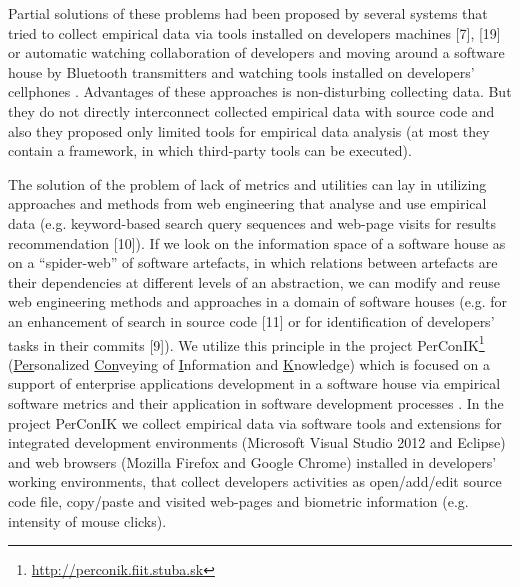 \documentclass[18px,a4, conference]{IEEEtran}
\begin{document}
 Partial solutions of these problems had been proposed by several systems that tried to collect empirical data via tools installed on developers machines [7], [19] or automatic watching collaboration of developers and moving around a software house by Bluetooth transmitters and watching tools installed on developers’ cellphones \cite{Corral2012}. Advantages of these approaches is non-disturbing collecting data. But they do not directly interconnect collected empirical data with source code and also they proposed only limited tools for empirical data analysis (at most they contain a framework, in which third-party tools can be executed).

 The solution of the problem of lack of metrics and utilities can lay in utilizing approaches and methods from web engineering that analyse and use empirical data (e.g. keyword-based search query sequences and web-page visits for results recommendation [10]). If we look on the information space of a software house as on a “spider-web” of software artefacts, in which relations between artefacts    
are their dependencies at different levels of an abstraction, we can modify and reuse web engineering methods and approaches in a domain of software houses (e.g. for an enhancement of search in source code [11] or for identiﬁcation of developers' tasks in their commits [9]). We utilize this principle in the project PerConIK\footnote{\url{http://perconik.fiit.stuba.sk}}  %
 (\underline{Per}sonalized \underline{Con}veying of \underline{I}nformation and \underline{K}nowledge) which is focused on a support of enterprise applications development in a software house via empirical software metrics and their application in software development processes \cite{Bieliková2012}                                           %
. In the project PerConIK we collect empirical data via software tools and extensions for integrated development environments (Microsoft Visual Studio 2012 and Eclipse) and web browsers (Mozilla Firefox and Google Chrome) installed in developers’ working environments, that collect developers activities as open/add/edit source code ﬁle, copy/paste and visited web-pages and biometric information (e.g. intensity of mouse clicks).
\end{document}
